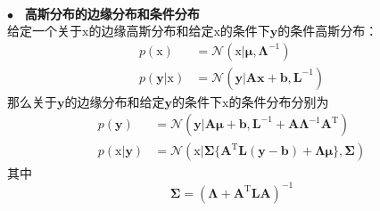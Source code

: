 \documentclass[b5paper]{book}
\numberwithin{equation}{chapter}
\newcommand {\bx} {\boldsymbol{\mathrm{x}}}
\newcommand {\rmT} {\mathrm{T}}
\newcommand {\bfMu} {\boldsymbol{\mu}}
\newcommand {\bfSigma} {\boldsymbol{\Sigma}}
\newcommand {\bfLambda} {\boldsymbol{\Lambda}}
\newcommand {\insertline} {\noindent{\color{red} \rule[5pt]{\textwidth}{0.1em}}}
\begin{document}
{	\insertline \\
	\color{red} $\bullet$ \textbf{\ 高斯分布的边缘分布和条件分布}　\color{black} \\
	\indent 给定一个关于$\bx$的边缘高斯分布和给定$\bx$的条件下$\mathbf{y}$的条件高斯分布：
	\begin{align}
		p(\bx) &= \mathcal{N}(\bx|\bfMu,\bfLambda^{-1})\\
		p(\mathbf{y}|\bx)&=\mathcal{N}(\mathbf{y}|\mathbf{Ax+b},\mathbf{L}^{-1})
	\end{align}
	那么关于$\mathbf{y}$的边缘分布和给定$\mathbf{y}$的条件下$\bx$的条件分布分别为
	\begin{align}
		p(\mathbf{y})&=\mathcal{N}(\mathbf{y}|\mathbf{A}\bfMu+\mathbf{b},\mathbf{L}^{-1}+\mathbf{A}\bfLambda^{-1}\mathbf{A}^{\rmT}) \\
		p(\bx|\mathbf{y})&=\mathcal{N}(\bx|\bfSigma\{\mathbf{A}^{\rmT}\mathbf{L(y-b)}+\bfLambda\bfMu\},\bfSigma)
	\end{align}
	其中
	\begin{equation}
		\bfSigma=(\bfLambda+\mathbf{A}^{\rmT}\mathbf{LA})^{-1}
	\end{equation}
	\insertline
	}
\end{document}

